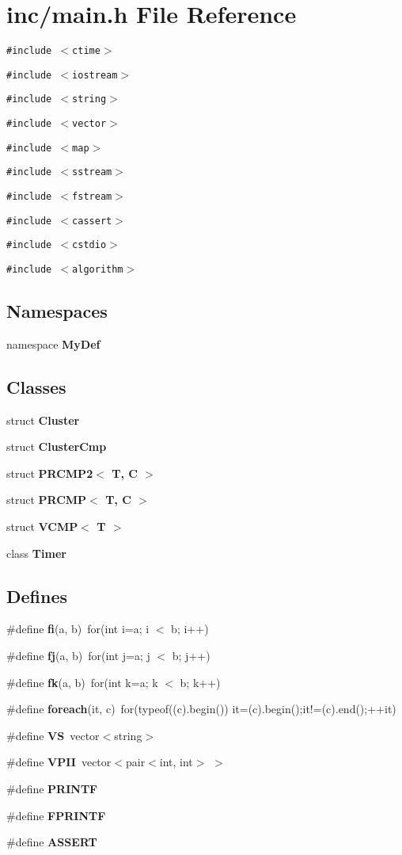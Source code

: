 \section{inc/main.h File Reference}
\label{main_8h}
{\tt \#include $<$ctime$>$}\par
{\tt \#include $<$iostream$>$}\par
{\tt \#include $<$string$>$}\par
{\tt \#include $<$vector$>$}\par
{\tt \#include $<$map$>$}\par
{\tt \#include $<$sstream$>$}\par
{\tt \#include $<$fstream$>$}\par
{\tt \#include $<$cassert$>$}\par
{\tt \#include $<$cstdio$>$}\par
{\tt \#include $<$algorithm$>$}\par
\subsection*{Namespaces}
\begin{CompactItemize}
\item 
namespace {\bf MyDef}
\end{CompactItemize}
\subsection*{Classes}
\begin{CompactItemize}
\item 
struct {\bf Cluster}
\item 
struct {\bf ClusterCmp}
\item 
struct {\bf PRCMP2$<$ T, C $>$}
\item 
struct {\bf PRCMP$<$ T, C $>$}
\item 
struct {\bf VCMP$<$ T $>$}
\item 
class {\bf Timer}
\end{CompactItemize}
\subsection*{Defines}
\begin{CompactItemize}
\item 
\#define {\bf fi}(a, b)~for(int i=a; i $<$ b; i++)
\item 
\#define {\bf fj}(a, b)~for(int j=a; j $<$ b; j++)
\item 
\#define {\bf fk}(a, b)~for(int k=a; k $<$ b; k++)
\item 
\#define {\bf foreach}(it, c)~for(typeof((c).begin()) it=(c).begin();it!=(c).end();++it)
\item 
\#define {\bf VS}~vector$<$string$>$
\item 
\#define {\bf VPII}~vector$<$pair$<$int, int$>$ $>$
\item 
\#define {\bf PRINTF}
\item 
\#define {\bf FPRINTF}
\item 
\#define {\bf ASSERT}
\end{CompactItemize}
